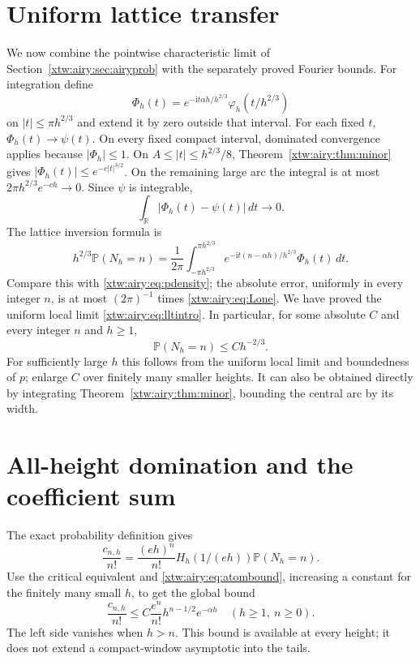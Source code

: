 \documentclass[11pt]{article}
\theoremstyle{remark}\newtheorem{remark}[theorem]{Remark}
\newcommand{\R}{\mathbb R}
\newcommand{\Prb}{\mathbb P}
\begin{document}
\section{Uniform lattice transfer}\label{xtw:airy:sec:local}
We now combine the pointwise characteristic limit of Section~\ref{xtw:airy:sec:airyprob}
with the separately proved Fourier bounds. For integration define
\[
 \Phi_h(t)=e^{-\mathrm it\alpha h/h^{2/3}}
                \varphi_h(t/h^{2/3})
\]
on $|t|\le\pi h^{2/3}$ and extend it by zero outside that interval.
For each fixed $t$, $\Phi_h(t)\to\psi(t)$. On every fixed compact interval,
dominated convergence applies because $|\Phi_h|\le1$. On
$A\le|t|\le h^{2/3}/8$, Theorem~\ref{xtw:airy:thm:minor} gives
$|\Phi_h(t)|\le e^{-c|t|^{3/2}}$. On the remaining large arc the integral is
at most $2\pi h^{2/3}e^{-ch}\to0$. Since $\psi$ is integrable,
\begin{equation}\label{xtw:airy:eq:Lone}
 \int_\R|\Phi_h(t)-\psi(t)|\,dt\longrightarrow0.
\end{equation}
The lattice inversion formula is
\[
 h^{2/3}\Prb(N_h=n)=\frac1{2\pi}
 \int_{-\pi h^{2/3}}^{\pi h^{2/3}}
 e^{-\mathrm it(n-\alpha h)/h^{2/3}}\Phi_h(t)\,dt.
\]
Compare this with \eqref{xtw:airy:eq:pdensity}; the absolute error, uniformly in every
integer $n$, is at most $(2\pi)^{-1}$ times \eqref{xtw:airy:eq:Lone}.
We have proved the uniform local limit \eqref{xtw:airy:eq:lltintro}. In particular,
for some absolute $C$ and every integer $n$ and $h\ge1$,
\begin{equation}\label{xtw:airy:eq:atombound}
 \Prb(N_h=n)\le C h^{-2/3}.
\end{equation}
For sufficiently large $h$ this follows from the uniform local limit and
boundedness of $p$; enlarge $C$ over finitely many smaller heights. It can
also be obtained directly by integrating Theorem~\ref{xtw:airy:thm:minor}, bounding
the central arc by its width.

\section{All-height domination and the coefficient sum}\label{xtw:airy:sec:sum}
The exact probability definition gives
\begin{equation}\label{xtw:airy:eq:exactcoefficient}
 \frac{c_{n,h}}{n!}=\frac{(eh)^n}{n!}
                 H_h(1/(eh))\Prb(N_h=n).
\end{equation}
Use the critical equivalent and \eqref{xtw:airy:eq:atombound}, increasing a constant
for the finitely many small $h$, to get the global bound
\begin{equation}\label{xtw:airy:eq:allheight}
 \frac{c_{n,h}}{n!}\le
 C\frac{e^n}{n!}h^{n-1/2}e^{-\alpha h}
 \quad(h\ge1,\ n\ge0).
\end{equation}
The left side vanishes when $h>n$. This bound is available at every height;
it does not extend a compact-window asymptotic into the tails.
\end{document}
